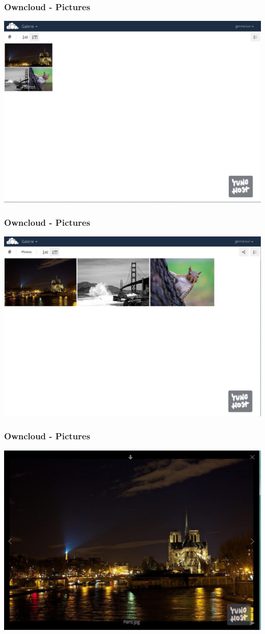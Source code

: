 \documentclass{beamer}
\begin{document}
\begin{frame}
\frametitle{Owncloud  - Pictures}
\includegraphics[scale=0.3] {./Owncloud/Owncloud_Galeries.jpg}
\end{frame}
\begin{frame}
\frametitle{Owncloud   - Pictures}
\includegraphics[scale=0.3] {./Owncloud/Owncloud_Galeries_01.jpg}
\end{frame}
\begin{frame}
\frametitle{Owncloud  - Pictures}
\includegraphics[scale=0.3] {./Owncloud/Owncloud_Galeries_02.jpg}
\end{frame}
\end{document}

